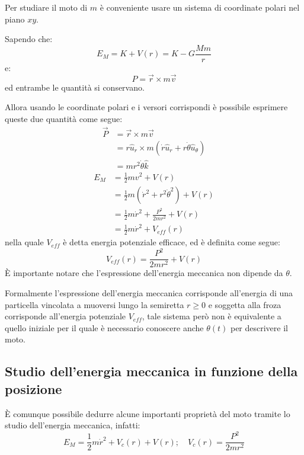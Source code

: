 \documentclass[11pt, a4paper, openright]{book}
\theoremstyle{plain}
\theoremstyle{definition}
\begin{document}
Per studiare il moto di $m$ è conveniente usare un sistema di coordinate polari nel piano $xy$.

Sapendo che:
\begin{equation}
    E_M = K + V(r) = K - G\frac{Mm}{r}
\end{equation}
e:
\begin{equation}
    P = \vec{r} \times m\vec{v}
\end{equation}
ed entrambe le quantità si conservano.

Allora usando le coordinate polari e i versori corrispondi è possibile esprimere queste due quantità come segue:
\begin{align}
    \vec{P} & = \vec{r} \times m\vec{v} \\
            & = r\hat{u}_r \times m(\dot{r}\hat{u}_r + r\dot{\theta}\hat{u}_\theta) \\
            & = mr^2\dot{\theta} \hat{k}
\end{align}
\begin{align}
    E_M & = \frac{1}{2}mv^2 + V(r) \\
        & = \frac{1}{2}m(\dot{r}^2 + r^2\dot{\theta}^2) + V(r) \\
        & = \frac{1}{2}m\dot{r}^2 + \frac{P^2}{2mr^2} + V(r) \\
        & = \frac{1}{2}m\dot{r}^2 + V_{eff}(r)
\end{align}
nella quale $V_{eff}$ è detta energia potenziale efficace, ed è definita come segue:
\begin{equation}
    V_{eff}(r) = \frac{P^2}{2mr^2} + V(r)
\end{equation}
È importante notare che l'espressione dell'energia meccanica non dipende da $\theta$.

Formalmente l'espressione dell'energia meccanica corrisponde all'energia di una particella vincolata a muoversi lungo la semiretta $r \geq 0$ e soggetta alla froza corrisponde all'energia potenziale $V_{eff}$, tale sistema però non è equivalente a quello iniziale per il quale è necessario conoscere anche $\theta(t)$ per descrivere il moto.

\newpage 

\subsection{Studio dell'energia meccanica in funzione della posizione}
È comunque possibile dedurre alcune importanti proprietà del moto tramite lo studio dell'energia meccanica, infatti:
\begin{equation}
    E_M = \frac{1}{2}m\dot{r}^2 + V_c(r) + V(r); \quad V_c(r) = \frac{P^2}{2mr^2}
\end{equation}
\end{document}
